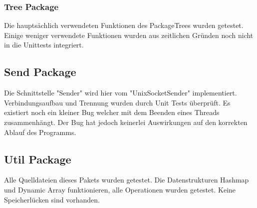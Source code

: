 		\subsubsection{Tree Package}
		Die hauptsächlich verwendeten Funktionen des PackageTrees wurden getestet. Einige weniger verwendete Funktionen wurden aus zeitlichen Gründen noch nicht in die Unittests integriert.
	
	\subsection{Send Package}
	Die Schnittstelle "{}Sender"{} wird hier vom "{}UnixSocketSender"{} implementiert. Verbindungsaufbau und Trennung wurden durch Unit Tests überprüft. Es existiert noch ein kleiner Bug welcher mit dem Beenden eines Threads zusammenhängt. Der Bug hat jedoch keinerlei Auswirkungen auf den korrekten Ablauf des Programms.
	
	\subsection{Util Package}
	Alle Quelldateien dieses Pakets wurden getestet. Die Datenstrukturen Hashmap und Dynamic Array funktionieren, alle Operationen wurden getestet. Keine Speicherlücken sind vorhanden.




